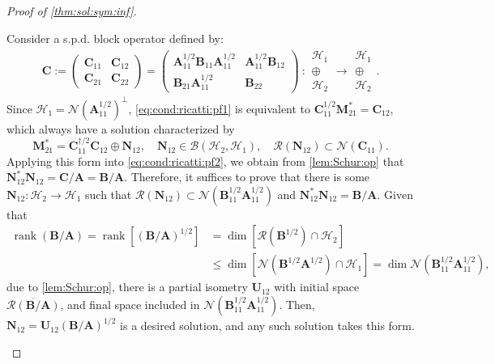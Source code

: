 \documentclass[10pt,a4paper]{amsart}
\DeclareMathOperator*{\rk}{rank}
\newcommand{\m}[1]{\mathbf{#1}} %
\renewcommand{\c}[1]{\mathcal{#1}} %
\begin{document}
\begin{proof}[Proof of \cref{thm:sol:sym:inf}]
\begin{itemize}[leftmargin = *]
Consider a s.p.d. block operator defined by:
\begin{align}\label{eq:comp:block}
    \m{C} := \begin{pmatrix}
        \m{C}_{11} & \m{C}_{12} \\
        \m{C}_{21} & \m{C}_{22}
    \end{pmatrix} = \begin{pmatrix}
        \m{A}_{11}^{1/2} \m{B}_{11} \m{A}_{11}^{1/2} & \m{A}_{11}^{1/2} \m{B}_{12} \\
        \m{B}_{21} \m{A}_{11}^{1/2} & \m{B}_{22}
    \end{pmatrix}
    \    :
    \begin{array}{c}
    \c{H}_{1} \\
    \oplus \\
    \c{H}_{2}
    \end{array}
    \rightarrow
    \begin{array}{c}
    \c{H}_{1} \\
    \oplus \\
    \c{H}_{2}
    \end{array}.
\end{align}
Since $\c{H}_{1} = \c{N}(\m{A}_{11}^{1/2})^{\perp}$, \eqref{eq:cond:ricatti:pf1} is equivalent to $\m{C}_{11}^{1/2} \m{M}_{21}^{*} = \m{C}_{12}$, which always have a solution characterized by
\begin{equation*}
    \m{M}_{21}^{*} = \m{C}_{11}^{\dagger/2} \m{C}_{12} \oplus \m{N}_{12}, \quad \m{N}_{12} \in \c{B}(\c{H}_{2}, \c{H}_{1}), \quad \c{R}(\m{N}_{12}) \subset \c{N}(\m{C}_{11}).
\end{equation*}
Applying this form into \eqref{eq:cond:ricatti:pf2}, we obtain from \cref{lem:Schur:op} that $\m{N}_{12}^{*} \m{N}_{12} = \m{C}/\m{A} = \m{B}/\m{A}$.
Therefore, it suffices to prove that there is some $\m{N}_{12}: \c{H}_{2} \rightarrow \c{H}_{1}$ such that $\c{R}(\m{N}_{12}) \subset \c{N} (\m{B}_{11}^{1/2} \m{A}_{11}^{1/2})$ and $\m{N}_{12}^{*} \m{N}_{12} = \m{B}/\m{A}$. Given that
\begin{align*}
    \rk (\m{B} / \m{A}) = \rk [(\m{B} / \m{A})^{1/2}] &= \dim [\c{R}(\m{B}^{1/2}) \cap \c{H}_{2}] \\
    &\le \dim [\c{N}(\m{B}^{1/2} \m{A}^{1/2}) \cap \c{H}_{1}] = \dim \c{N} (\m{B}_{11}^{1/2} \m{A}_{11}^{1/2}),
\end{align*}
due to \cref{lem:Schur:op}, there is a partial isometry $\m{U}_{12}$ with initial space $\overline{\c{R}(\m{B}/\m{A})}$, and final space included in $\c{N}(\m{B}_{11}^{1/2} \m{A}_{11}^{1/2})$. Then, $\m{N}_{12} = \m{U}_{12} (\m{B}/\m{A})^{1/2}$ is a desired solution, and any such solution takes this form.
\end{itemize}
\end{proof}
\end{document}
